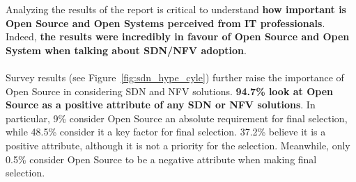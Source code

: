 \documentclass[a4paper, 12pt]{book}
\begin{document}
Analyzing the results of the report is critical to understand \textbf{how important is Open Source and Open Systems perceived from IT professionals}. Indeed, \textbf{the results were incredibly in favour of Open Source and Open System when talking about SDN/NFV adoption}.\\
\\
Survey results (see Figure~\ref{fig:sdn_hype_cyle}) further raise the importance of Open Source in considering SDN and NFV solutions. \textbf{94.7\% look at Open Source as a positive attribute of any SDN or NFV solutions}. In particular, 9\% consider Open Source an absolute requirement for final selection, while 48.5\% consider it a key factor for final selection. 37.2\% believe it is a positive attribute, although it is not a priority for the selection. Meanwhile, only 0.5\% consider Open Source to be a negative attribute when making final selection.
\end{document}
